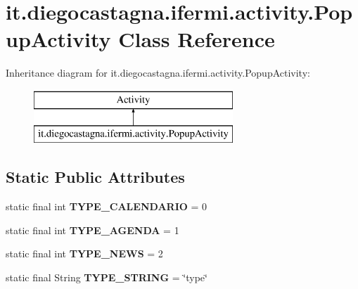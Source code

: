 \hypertarget{classit_1_1diegocastagna_1_1ifermi_1_1activity_1_1_popup_activity}{}\section{it.\+diegocastagna.\+ifermi.\+activity.\+Popup\+Activity Class Reference}
\label{classit_1_1diegocastagna_1_1ifermi_1_1activity_1_1_popup_activity}
Inheritance diagram for it.\+diegocastagna.\+ifermi.\+activity.\+Popup\+Activity\+:\begin{figure}[H]
\begin{center}
\leavevmode
\includegraphics[height=2.000000cm]{classit_1_1diegocastagna_1_1ifermi_1_1activity_1_1_popup_activity}
\end{center}
\end{figure}
\subsection*{Static Public Attributes}
\begin{DoxyCompactItemize}
\item 
\mbox{\label{classit_1_1diegocastagna_1_1ifermi_1_1activity_1_1_popup_activity_a38dac06e704458649189e87ab1056ae4}} 
static final int {\bfseries T\+Y\+P\+E\+\_\+\+C\+A\+L\+E\+N\+D\+A\+R\+IO} = 0
\item 
\mbox{\label{classit_1_1diegocastagna_1_1ifermi_1_1activity_1_1_popup_activity_a6933c7b3b5526c36aaa3c96576f77a8c}} 
static final int {\bfseries T\+Y\+P\+E\+\_\+\+A\+G\+E\+N\+DA} = 1
\item 
\mbox{\label{classit_1_1diegocastagna_1_1ifermi_1_1activity_1_1_popup_activity_ad0f5c9ed8a2003eac84b1f172b3ab5e5}} 
static final int {\bfseries T\+Y\+P\+E\+\_\+\+N\+E\+WS} = 2
\item 
\mbox{\label{classit_1_1diegocastagna_1_1ifermi_1_1activity_1_1_popup_activity_afdabafbe775264f7a763c23240c5214b}} 
static final String {\bfseries T\+Y\+P\+E\+\_\+\+S\+T\+R\+I\+NG} = \char`\"{}type\char`\"{}
\end{DoxyCompactItemize}
